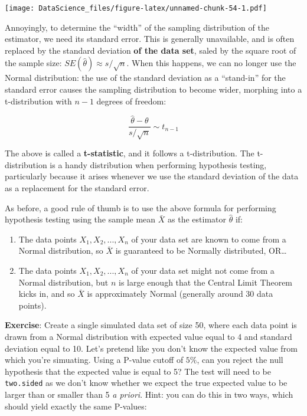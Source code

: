 \documentclass[
]{book}
\begin{document}
\texttt{[image: DataScience\_files/figure-latex/unnamed-chunk-54-1.pdf]}

Annoyingly, to determine the ``width'' of the sampling distribution of the estimator, we need its standard error. This is generally unavailable, and is often replaced by the standard deviation \textbf{of the data set}, saled by the square root of the sample size: \(SE(\hat{\theta}) \approx s/\sqrt{n}\). When this happens, we can no longer use the Normal distribution: the use of the standard deviation as a ``stand-in'' for the standard error causes the sampling distribution to become wider, morphing into a t-distribution with \(n-1\) degrees of freedom:

\[\frac{\hat{\theta} - \theta}{s/\sqrt{n}} \sim t_{n-1}\]

The above is called a \textbf{t-statistic}, and it follows a t-distribution. The t-distribution is a handy distribution when performing hypothesis testing, particularly because it arises whenever we use the standard deviation of the data as a replacement for the standard error.

As before, a good rule of thumb is to use the above formula for performing hypothesis testing using the sample mean \(\bar{X}\) as the estimator \(\hat{\theta}\) if:

\begin{enumerate}
\def\labelenumi{\arabic{enumi}.}
\item
  The data points \(X_1, X_2, ..., X_n\) of your data set are known to come from a Normal distribution, so \(\bar{X}\) is guaranteed to be Normally distributed, OR\ldots{}
\item
  The data points \(X_1, X_2, ..., X_n\) of your data set might not come from a Normal distribution, but \(n\) is large enough that the Central Limit Theorem kicks in, and so \(\bar{X}\) is approximately Normal (generally around 30 data points).
\end{enumerate}

\textbf{Exercise}: Create a single simulated data set of size 50, where each data point is drawn from a Normal distribution with expected value equal to 4 and standard deviation equal to 10. Let's pretend like you don't know the expected value from which you're simuating. Using a P-value cutoff of \(5\%\), can you reject the null hypothesis that the expected value is equal to 5? The test will need to be \texttt{two.sided} as we don't know whether we expect the true expected value to be larger than or smaller than 5 \emph{a priori}.
Hint: you can do this in two ways, which should yield exactly the same P-values:
\end{document}
